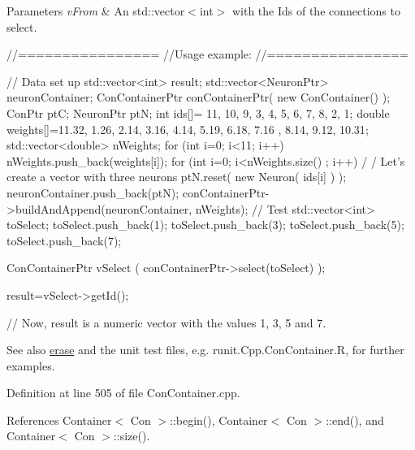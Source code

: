 \begin{DoxyParams}{Parameters}
{\em vFrom} & An std::vector$<$int$>$ with the Ids of the connections to select.\\
\hline
\end{DoxyParams}

\begin{DoxyCode}
        //================
        //Usage example:
        //================

        // Data set up
                std::vector<int> result;
                std::vector<NeuronPtr> neuronContainer;
                ConContainerPtr conContainerPtr( new ConContainer() );
                ConPtr  ptC;
                NeuronPtr ptN;
                int ids[]= {11, 10, 9, 3, 4, 5, 6, 7, 8, 2, 1};
                double weights[]={11.32, 1.26, 2.14, 3.16, 4.14, 5.19, 6.18, 7.16
      , 8.14, 9.12, 10.31};
                std::vector<double> nWeights;
                for (int i=0; i<11; i++) {
                        nWeights.push_back(weights[i]);
                }
                for (int i=0; i<nWeights.size() ; i++) {                                /
      / Let's create a vector with three neurons
                        ptN.reset( new Neuron( ids[i] ) );
                        neuronContainer.push_back(ptN);
                }
                conContainerPtr->buildAndAppend(neuronContainer, nWeights);
                // Test
                std::vector<int> toSelect;
                toSelect.push_back(1);
                toSelect.push_back(3);
                toSelect.push_back(5);
                toSelect.push_back(7);

                ConContainerPtr  vSelect (  conContainerPtr->select(toSelect)  );
      
                result=vSelect->getId();

                // Now, result is a numeric vector with the values 1, 3, 5 and 7.
      
\end{DoxyCode}


\begin{DoxySeeAlso}{See also}
\hyperlink{class_con_container_a9665acde2f526ae4207b919c90615fe5}{erase} and the unit test files, e.g. runit.Cpp.ConContainer.R, for further examples. 
\end{DoxySeeAlso}


Definition at line 505 of file ConContainer.cpp.



References Container$<$ Con $>$::begin(), Container$<$ Con $>$::end(), and Container$<$ Con $>$::size().



